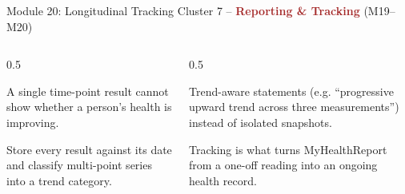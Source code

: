\documentclass[9pt,aspectratio=169]{beamer}
\begin{document}
\begin{frame}{Module 20: Longitudinal Tracking}
\textcolor{black!55}{\scriptsize Cluster 7 -- \textcolor{brown}{\textbf{Reporting \& Tracking}} (M19--M20)}\\[2pt]
\begin{columns}[T,onlytextwidth]
\begin{column}{0.5\textwidth}
\begin{tcolorbox}[colback=blue!7,colframe=blue!55!black,title=\textbf{Motivation},boxrule=0.6pt,arc=1mm,left=5pt,right=5pt,top=3pt,bottom=3pt,fonttitle=\small]
\footnotesize A single time-point result cannot show whether a person's health is improving.
\end{tcolorbox}
\vspace{5pt}
\begin{tcolorbox}[colback=teal!7,colframe=teal!55!black,title=\textbf{Method},boxrule=0.6pt,arc=1mm,left=5pt,right=5pt,top=3pt,bottom=3pt,fonttitle=\small]
\footnotesize Store every result against its date and classify multi-point series into a trend category.
\end{tcolorbox}
\end{column}
\begin{column}{0.5\textwidth}
\begin{tcolorbox}[colback=green!8,colframe=green!45!black,title=\textbf{Result},boxrule=0.6pt,arc=1mm,left=5pt,right=5pt,top=3pt,bottom=3pt,fonttitle=\small]
\footnotesize Trend-aware statements (e.g. \textquotedblleft progressive upward trend across three measurements\textquotedblright) instead of isolated snapshots.
\end{tcolorbox}
\vspace{5pt}
\begin{tcolorbox}[colback=orange!10,colframe=orange!65!black,title=\textbf{Conclusion},boxrule=0.6pt,arc=1mm,left=5pt,right=5pt,top=3pt,bottom=3pt,fonttitle=\small]
\footnotesize Tracking is what turns MyHealthReport from a one-off reading into an ongoing health record.
\end{tcolorbox}
\end{column}
\end{columns}
\end{frame}
\end{document}
